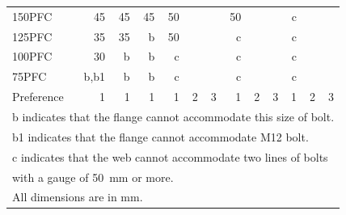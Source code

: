 \begin{table}[H]
\begin{minipage}{.8\linewidth}
\begin{tabular}{l|rrr|rrr|rrr|rrr}
	150PFC                      &                      45 &                      45 &                       45 &  50 &    &               &  50 &    &               &   c &    &              \\
	125PFC                      &                      35 &                      35 &                        b &  50 &    &               &   c &    &               &   c &    &              \\
	100PFC                      &                      30 &                       b &                        b &   c &    &               &   c &    &               &   c &    &              \\
	75PFC                       &                    b,b1 &                       b &                        b &   c &    &               &   c &    &               &   c &    &              \\
	Preference                  &                       1 &                       1 &                        1 &   1 &  2 &             3 &   1 &  2 &             3 &   1 &  2 &            3 \\ \bottomrule
\multicolumn{13}{l}{b indicates that the flange cannot accommodate this size of bolt.}\\
\multicolumn{13}{l}{b1 indicates that the flange cannot accommodate M12 bolt.}\\
\multicolumn{13}{l}{c indicates that the web cannot accommodate two lines of bolts}\\
\multicolumn{13}{l}{with a gauge of \SI{50}{\mm} or more.}\\
\multicolumn{13}{l}{All dimensions are in \si{\mm}.}
\end{tabular}
\end{minipage}
\begin{minipage}{.19\linewidth}\centering

\end{minipage}
\end{table}
